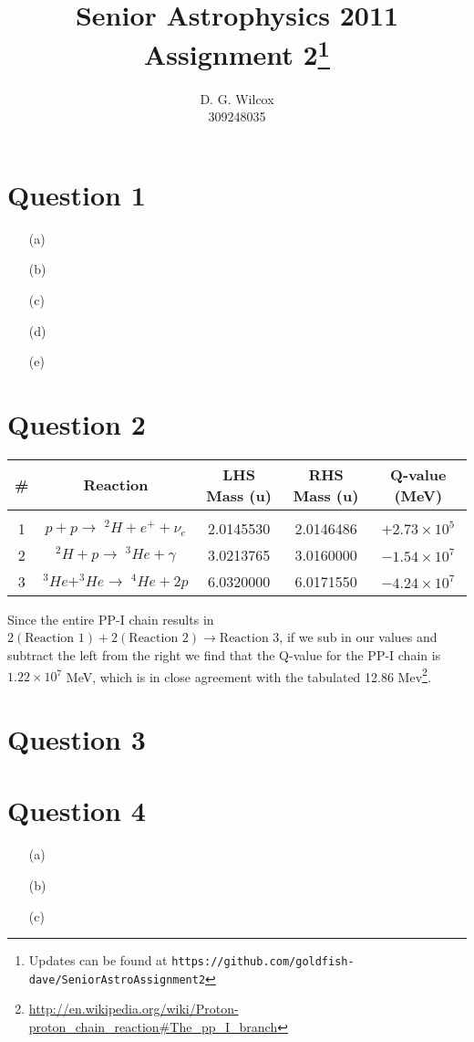 \documentclass[10pt,a4paper]{article}
\title{Senior Astrophysics 2011 Assignment 2\footnote{Updates can be found at \texttt{https://github.com/goldfish-dave/SeniorAstroAssignment2}}}
\date{}
\author{D. G. Wilcox \\
		309248035}
\begin{document}
\maketitle

\section*{Question 1}
\begin{itemize}
    \item[(a)]
    \item[(b)]
    \item[(c)]
    \item[(d)]
    \item[(e)]
\end{itemize}
\section*{Question 2}
\newcommand{\reactionOne}{$p + p \rightarrow \; ^{2}H + e^{+} + \nu_{e}$}
\newcommand{\reactionTwo}{$^{2}H + p \rightarrow \;^{3}He + \gamma$}
\newcommand{\reactionThree}{$^{3}He + ^{3}He \rightarrow \;^{4}He + 2p$}

\newcommand{\qvalueOne}{$+2.73 \times 10^{5}$}
\newcommand{\qvalueTwo}{$-1.54 \times 10^{7}$}
\newcommand{\qvalueThree}{$-4.24 \times 10^{7}$}

\begin{table}[h]
    \begin{tabular}{c|c|c|c|c}
        \#   &   Reaction            &   LHS Mass   (u)    &   RHS Mass (u)    &   Q-value (MeV) \\
        \hline \\
        1    &   \reactionOne{}      &   2.0145530         &   2.0146486       &   \qvalueOne{}  \\
        2    &   \reactionTwo{}      &   3.0213765         &   3.0160000       &   \qvalueTwo{}  \\
        3    &   \reactionThree{}    &   6.0320000         &   6.0171550       &   \qvalueThree{} \\
    \end{tabular}
\end{table}
Since the entire PP-I chain results in $2(\mbox{Reaction } 1) + 2(\mbox{Reaction } 2) \rightarrow \mbox{Reaction } 3$, if we sub in our values and subtract the left from the right we find that the Q-value for the PP-I chain is $1.22 \times 10^{7}$ MeV, which is in close agreement with the tabulated 12.86 Mev\footnote{\url{http://en.wikipedia.org/wiki/Proton-proton_chain_reaction#The_pp_I_branch}}.
\section*{Question 3}
\section*{Question 4}
\begin{itemize}
    \item[(a)]
    \item[(b)]
    \item[(c)]
\end{itemize}
\end{document}
